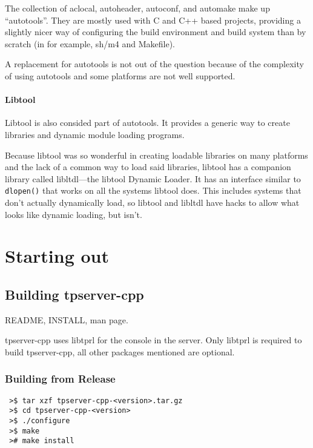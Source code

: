 \documentclass[a4paper,11pt]{report}
\begin{document}
The collection of aclocal, autoheader, autoconf, and automake make up ``autotools''. They are mostly used with C and C++ based projects, providing a slightly nicer way of configuring the build environment and build system than by scratch (in for example, sh/m4 and Makefile).

A replacement for autotools is not out of the question because of the complexity of using autotools and some platforms are not well supported.

\subsection{Libtool}
\label{sec:libtool}

Libtool is also consided part of autotools. It provides a generic way to create libraries and dynamic module loading programs.

Because libtool was so wonderful in creating loadable libraries on many platforms and the lack of a common way to load said libraries, libtool has a companion library called libltdl---the libtool Dynamic Loader.  It has an interface similar to \texttt{dlopen()} that works on all the systems libtool does. This includes systems that don't actually dynamically load, so libtool and libltdl have hacks to allow what looks like dynamic loading, but isn't.


\part{Starting out}
\label{part:starting}

\chapter{Building tpserver-cpp}
\label{chap:building-tpserver-cpp}

README, INSTALL, man page.

tpserver-cpp uses libtprl for the console in the server. Only libtprl is required to build tpserver-cpp, all other packages mentioned are optional.

\section{Building from Release}
\label{sec:release-build}

\begin{verbatim}
 >$ tar xzf tpserver-cpp-<version>.tar.gz
 >$ cd tpserver-cpp-<version>
 >$ ./configure
 >$ make
 ># make install
\end{verbatim}
\end{document}
